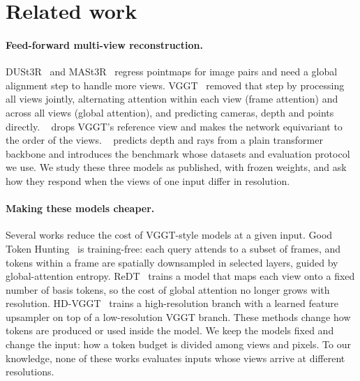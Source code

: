\section{Related work}
\label{sec:related}

\paragraph{Feed-forward multi-view reconstruction.}
DUSt3R~\cite{wang2024dust3r} and MASt3R~\cite{leroy2024mast3r} regress pointmaps for image pairs and need a global alignment step to handle more views. VGGT~\cite{wang2025vggt} removed that step by processing all views jointly, alternating attention within each view (frame attention) and across all views (global attention), and predicting cameras, depth and points directly. \pithree~\cite{wang2025pi3} drops VGGT's reference view and makes the network equivariant to the order of the views. \dathree~\cite{lin2025da3} predicts depth and rays from a plain transformer backbone and introduces the benchmark whose datasets and evaluation protocol we use. We study these three models as published, with frozen weights, and ask how they respond when the views of one input differ in resolution.

\paragraph{Making these models cheaper.}
Several works reduce the cost of VGGT-style models at a given input. Good Token Hunting~\cite{goodtoken2026} is training-free: each query attends to a subset of frames, and tokens within a frame are spatially downsampled in selected layers, guided by global-attention entropy. ReDT~\cite{redt2026} trains a model that maps each view onto a fixed number of basis tokens, so the cost of global attention no longer grows with resolution. HD-VGGT~\cite{hdvggt2026} trains a high-resolution branch with a learned feature upsampler on top of a low-resolution VGGT branch. These methods change how tokens are produced or used inside the model. We keep the models fixed and change the input: how a token budget is divided among views and pixels. To our knowledge, none of these works evaluates inputs whose views arrive at different resolutions.

